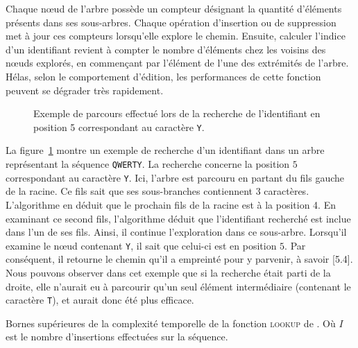\noindent Chaque nœud de l'arbre possède un compteur désignant la quantité
d'éléments présents dans ses sous-arbres. Chaque opération d'insertion ou de
suppression met à jour ces compteurs lorsqu'elle explore le chemin. Ensuite,
calculer l'indice d'un identifiant revient à compter le nombre d'éléments chez
les voisins des nœuds explorés, en commençant par l'élément de l'une des
extrémités de l'arbre. Hélas, selon le comportement d'édition, les performances
de cette fonction peuvent se dégrader très rapidement.

\begin{figure}
  \centering
  
  \caption[Recherche d'identifiants dans l'arbre] {\label{repl:fig:getexample}
    Exemple de parcours effectué lors de la recherche de l'identifiant en
    position 5 correspondant au caractère \texttt{Y}.}
\end{figure}

\noindent La figure~\ref{repl:fig:getexample} montre un exemple de recherche
d'un identifiant dans un arbre représentant la séquence \texttt{QWERTY}. La
recherche concerne la position $5$ correspondant au caractère \texttt{Y}. Ici,
l'arbre est parcouru en partant du fils gauche de la racine. Ce fils sait que
ses sous-branches contiennent 3 caractères. L'algorithme en déduit que le
prochain fils de la racine est à la position 4. En examinant ce second fils,
l'algorithme déduit que l'identifiant recherché est inclue dans l'un de ses
fils. Ainsi, il continue l'exploration dans ce sous-arbre. Lorsqu'il examine le
nœud contenant \texttt{Y}, il sait que celui-ci est en position $5$. Par
conséquent, il retourne le chemin qu'il a empreinté pour y parvenir, à savoir
[5.4]. Nous pouvons observer dans cet exemple que si la recherche était parti de
la droite, elle n'aurait eu à parcourir qu'un seul élément intermédiaire
(contenant le caractère \texttt{T}), et aurait donc été plus efficace.

\begin{table}
  \begin{center}
    \caption[Bornes supérieures de la complexité temporelle de la fonction
    \textsc{lookup} de \LSEQ] {\label{repl:table:lseqlookup} Bornes supérieures
      de la complexité temporelle de la fonction \textsc{lookup} de \LSEQ. Où
      $I$ est le nombre d'insertions effectuées sur la séquence.}
    
  \end{center}
\end{table}

